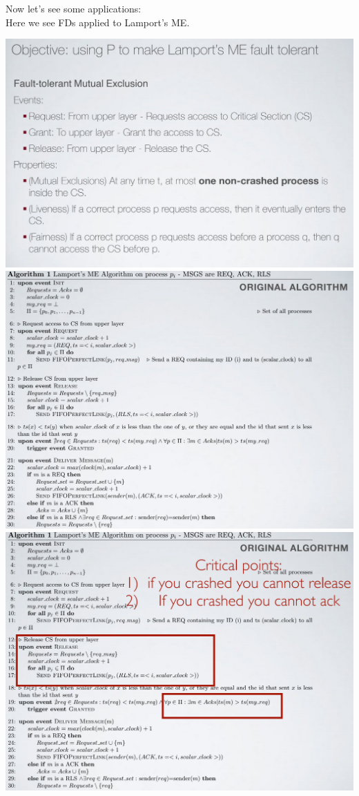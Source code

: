 \documentclass[11pt, a4paper]{article}
\begin{document}
Now let's see some applications:\\
Here we see FDs applied to Lamport's ME.
\begin{center}
    \includegraphics[scale=0.5]{img/LE/ME1.png}
    \includegraphics[scale=0.5]{img/LE/ME-Original.png}
    \includegraphics[scale=0.5]{img/LE/ME-Problems.png}

\end{center}
\end{document}
